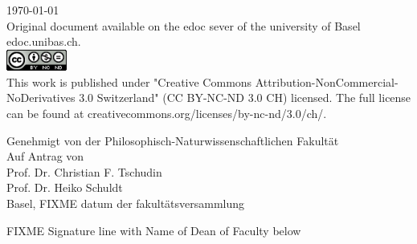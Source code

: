\begin{titlepage}
\begin{center}

{\large \today\\[1cm]}
{\footnotesize Original document available on the edoc sever of the university of Basel edoc.unibas.ch.\\[0.5cm]
\includegraphics[height=7mm]{./inc/cclic}~\\[0.5cm]
This work is published under  "Creative Commons Attribution-NonCommercial-NoDerivatives 3.0 Switzerland" (CC BY-NC-ND 3.0 CH) licensed. The full license can be found at creativecommons.org/licenses/by-nc-nd/3.0/ch/.
}

\end{center}
\end{titlepage}

{\pagestyle{empty}
\pagecolor{orange}\afterpage{\nopagecolor}
\begin{center}
Genehmigt von der Philosophisch-Naturwissenschaftlichen Fakultät\\
Auf Antrag von\\
Prof. Dr. Christian F. Tschudin\\Prof. Dr. Heiko Schuldt\\
\vfill 
Basel, FIXME datum der fakultätsversammlung
{\raggedright FIXME Signature line with Name of Dean of Faculty below}

\end{center}
}


